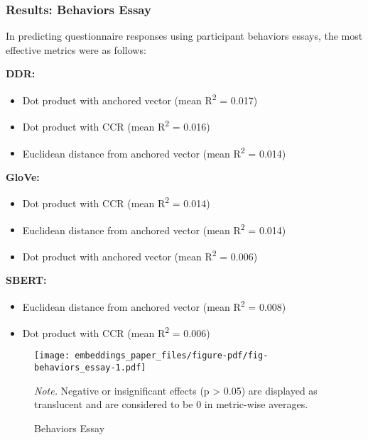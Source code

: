 \documentclass[
  man,
  floatsintext,
  longtable,
  nolmodern,
  notxfonts,
  notimes,
  colorlinks=true,linkcolor=blue,citecolor=blue,urlcolor=blue]{apa7}
\providecommand{\tightlist}{%
  \setlength{\itemsep}{0pt}\setlength{\parskip}{0pt}}
\begin{document}
\subsubsection{Results: Behaviors Essay}\label{results-behaviors-essay}

In predicting questionnaire responses using participant behaviors
essays, the most effective metrics were as follows:

\textbf{DDR:}

\begin{itemize}
\tightlist
\item
  Dot product with anchored vector (mean R\textsuperscript{2} = 0.017)
\item
  Dot product with CCR (mean R\textsuperscript{2} = 0.016)
\item
  Euclidean distance from anchored vector (mean R\textsuperscript{2} =
  0.014)
\end{itemize}

\textbf{GloVe:}

\begin{itemize}
\tightlist
\item
  Dot product with CCR (mean R\textsuperscript{2} = 0.014)
\item
  Euclidean distance from anchored vector (mean R\textsuperscript{2} =
  0.014)
\item
  Dot product with anchored vector (mean R\textsuperscript{2} = 0.006)
\end{itemize}

\textbf{SBERT:}

\begin{itemize}
\tightlist
\item
  Euclidean distance from anchored vector (mean R\textsuperscript{2} =
  0.008)
\item
  Dot product with CCR (mean R\textsuperscript{2} = 0.006)
\end{itemize}

\begin{figure}

{\caption{{Behaviors Essay}{\label{fig-behaviors\_essay}}}}

\texttt{[image: embeddings\_paper\_files/figure-pdf/fig-behaviors\_essay-1.pdf]}

{\noindent \emph{Note.} Negative or insignificant effects (p
\textgreater{} 0.05) are displayed as translucent and are considered to
be 0 in metric-wise averages.}

\end{figure}
\end{document}
